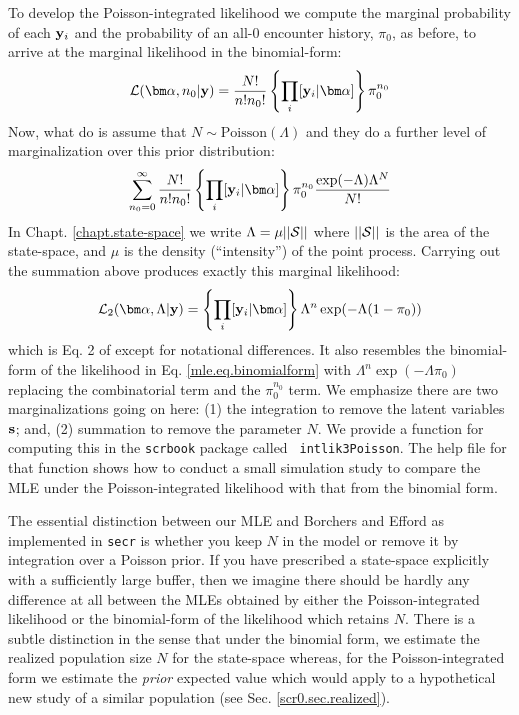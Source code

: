To develop the Poisson-integrated likelihood 
we compute the marginal
probability of each ${\bf y}_{i}$ and the probability of an all-0
encounter history, $\pi_{0}$, as before, 
to arrive at the  marginal likelihood in the binomial-form:
\[
 {\cal L}({\bm \alpha},n_{0} | {\bf y})  = \frac{N!}{n! n_{0}!} 
 \left\{ \prod_{i}  [{\bf y}_{i}|{\bm \alpha}] 
\right\}
 \pi_{0}^{n_{0}}
\]
Now, what \citet{borchers_efford:2008} do is
assume that $N \sim \mbox{Poisson}(\Lambda)$ and they do a further level
of marginalization over this prior distribution:
\[
\sum_{n_{0}=0}^{\infty}  
\frac{N!}{n! n_{0}!} 
 \left\{ \prod_{i}  [{\bf y}_{i}|{\bm \alpha}] \right\}
 \pi_{0}^{n_{0}}
\frac{\exp(-\Lambda) \Lambda^{N}}{N!}
\]
In Chapt. \ref{chapt.state-space} we write $\Lambda = \mu ||{\cal
  S}||$ where $||{\cal S}||$ is the area of the state-space, and $\mu$
is the density (``intensity'') of the point process. 
Carrying out the summation above produces exactly this marginal likelihood:
\[
{\cal L}_{2}({\bm \alpha}, \Lambda | {\bf y}) = 
 \left\{ \prod_{i}  [{\bf y}_{i}|{\bm \alpha}] \right\}  \Lambda^{n}   \exp( - \Lambda (1-\pi_{0}) )
\]
which is Eq. 2 of \citet{borchers_efford:2008} except for notational
differences. It also resembles the binomial-form of the likelihood in
Eq. \ref{mle.eq.binomialform} with
$\Lambda^{n}   \exp( - \Lambda \pi_{0} )$ replacing the combinatorial
term and the $\pi_{0}^{n_{0}}$ term. 
We emphasize there are two marginalizations
 going on here: (1) the
integration to remove the latent variables ${\bf s}$; and, (2) 
summation to remove the parameter $N$. 
We provide a function for
computing this in the \mbox{\tt scrbook} package called \mbox{\tt
  intlik3Poisson}. The help file for that function shows how to
conduct a small simulation study to compare the MLE under the
Poisson-integrated likelihood with that from the binomial form. 

The essential distinction between our MLE and Borchers and Efford
as implemented in \mbox{\tt secr}
is whether you keep $N$ in the model or remove it by
integration over a Poisson prior. If you have prescribed a state-space
explicitly with a sufficiently large buffer, then we imagine there
should be hardly any difference at all between the MLEs obtained by
either the Poisson-integrated likelihood or the binomial-form of the
likelihood which retains $N$.
There is a subtle distinction in the sense that under the binomial
form, we estimate the realized population size $N$ for the state-space
whereas, for the Poisson-integrated form we estimate the {\it prior} 
expected value which would apply to a hypothetical new study of a
similar population (see Sec. \ref{scr0.sec.realized}).


